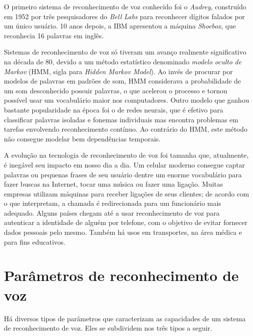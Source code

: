 O primeiro sistema de reconhecimento de voz conhecido foi o \textit{Audrey}, construído em 1952 por três pesquisadores do \textit{Bell Labs} para reconhecer dígitos falados por um único usuário. 10 anos depois, a IBM apresentou a máquina \textit{Shoebox}, que reconhecia 16 palavras em inglês.

Sistemas de reconhecimento de voz só tiveram um avanço realmente significativo na década de 80, devido a um método estatístico denominado \emph{modelo oculto de Markov} (HMM, sigla para \textit{Hidden Markov Model}). Ao invés de procurar por modelos de palavras em padrões de som, HMM considerava a probabilidade de um som desconhecido possuir palavras, o que acelerou o processo e tornou possível usar um vocabulário maior nos computadores. Outro modelo que ganhou bastante popularidade na época foi o de redes neurais, que é efetivo para classificar palavras isoladas e fonemas individuais mas encontra problemas em tarefas envolvendo reconhecimento contínuo. Ao contrário do HMM, este método não consegue modelar bem dependências temporais.

A evolução na tecnologia de reconhecimento de voz foi tamanha que, atualmente, é inegável seu impacto em nosso dia a dia. Um celular moderno consegue captar palavras ou pequenas frases de seu usuário dentre um enorme vocabulário para fazer buscas na Internet, tocar uma música ou fazer uma ligação. Muitas empresas utilizam máquinas para receber ligações de seus clientes; de acordo com o que interpretam, a chamada é redirecionada para um funcionário mais adequado. Alguns países chegam até a usar reconhecimento de voz para autenticar a identidade de alguém por telefone, com o objetivo de evitar fornecer dados pessoais pelo mesmo. Também há usos em transportes, na área médica e para fins educativos.


\section{Parâmetros de reconhecimento de voz}

Há diversos tipos de parâmetros que caracterizam as capacidades de um sistema de reconhecimento de voz. Eles se subdividem nos três tipos a seguir.

